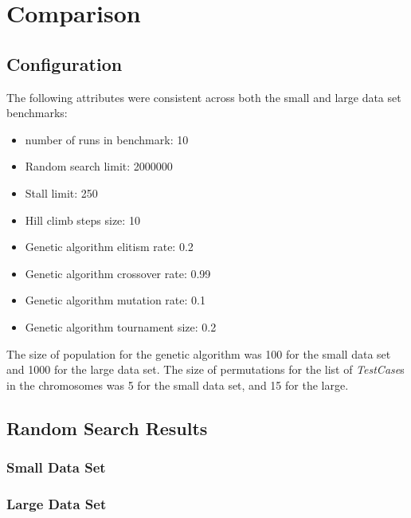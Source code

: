 \documentclass[11pt, a4paper]{article}
\begin{document}
\section{Comparison}
\subsection{Configuration} %
\label{sub:configuration}
The following attributes were consistent across both the small and large data
set benchmarks:
\begin{itemize}
	\item number of runs in benchmark: 10
	\item Random search limit: 2000000
	\item Stall limit: 250
	\item Hill climb steps size: 10
	\item Genetic algorithm elitism rate: 0.2
	\item Genetic algorithm crossover rate: 0.99
	\item Genetic algorithm mutation rate: 0.1
	\item Genetic algorithm tournament size: 0.2
\end{itemize}

The size of population for the genetic algorithm was 100 for the small data set
and 1000 for the large data set. The size of permutations for the list of
\emph{TestCase}s in the chromosomes was 5 for the small data set, and 15 for the
large.

\subsection{Random Search Results}
\subsubsection{Small Data Set} %
\label{ssub:random_small_data_set}
 

\subsubsection{Large Data Set} %
\label{ssub:random_large_data_set}
 
\end{document}
